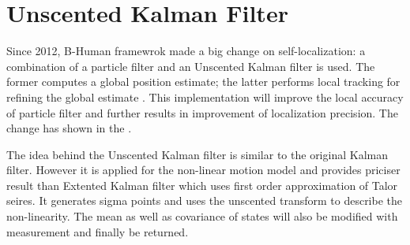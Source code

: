 \section{Unscented Kalman Filter}
Since 2012, B-Human framewrok made a big change on self-localization: a combination of a particle filter and an Unscented Kalman filter is used.
The former computes a global position estimate; the latter performs local tracking for refining the global estimate \cite{BHumanCodeRelease2012}. 
This implementation will improve the local accuracy of particle filter and further results in improvement of localization precision. The change has shown in the . 

The idea behind the Unscented Kalman filter is similar to the original Kalman filter. However it is applied for the non-linear motion model and provides priciser result than Extented Kalman filter which uses first order approximation of Talor seires. It generates sigma points and uses the unscented transform to describe the non-linearity. The mean as well as covariance of states will also be modified with measurement and finally be returned.
